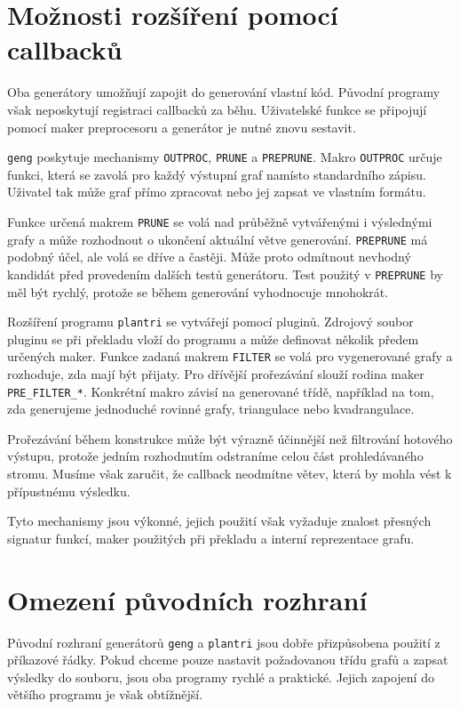\section{Možnosti rozšíření pomocí callbacků}
\label{sec:generator-callbacks}


Oba generátory umožňují zapojit do generování vlastní kód. Původní programy
však neposkytují registraci callbacků za běhu. Uživatelské funkce se připojují
pomocí maker preprocesoru a generátor je nutné znovu sestavit.

\texttt{geng} poskytuje mechanismy \texttt{OUTPROC}, \texttt{PRUNE} a
\texttt{PREPRUNE}. Makro \texttt{OUTPROC} určuje funkci, která se zavolá pro
každý výstupní graf namísto standardního zápisu. Uživatel tak může graf přímo
zpracovat nebo jej zapsat ve vlastním formátu.

Funkce určená makrem \texttt{PRUNE} se volá nad průběžně vytvářenými i
výslednými grafy a může rozhodnout o ukončení aktuální větve generování.
\texttt{PREPRUNE} má podobný účel, ale volá se dříve a častěji. Může proto
odmítnout nevhodný kandidát před provedením dalších testů generátoru. Test
použitý v \texttt{PREPRUNE} by měl být rychlý, protože se během generování
vyhodnocuje mnohokrát.

Rozšíření programu \texttt{plantri} se vytvářejí pomocí pluginů. Zdrojový
soubor pluginu se při překladu vloží do programu a může definovat několik
předem určených maker. Funkce zadaná makrem \texttt{FILTER} se volá pro
vygenerované grafy a rozhoduje, zda mají být přijaty. Pro dřívější
prořezávání slouží rodina maker \texttt{PRE\_FILTER\_*}. Konkrétní makro
závisí na generované třídě, například na tom, zda generujeme jednoduché
rovinné grafy, triangulace nebo kvadrangulace.

Prořezávání během konstrukce může být výrazně účinnější než filtrování
hotového výstupu, protože jedním rozhodnutím odstraníme celou část
prohledávaného stromu. Musíme však zaručit, že callback neodmítne větev, která
by mohla vést k přípustnému výsledku.

Tyto mechanismy jsou výkonné, jejich použití však vyžaduje znalost přesných
signatur funkcí, maker použitých při překladu a interní reprezentace grafu.

\section{Omezení původních rozhraní}
\label{sec:original-interface-limitations}

Původní rozhraní generátorů \texttt{geng} a \texttt{plantri} jsou dobře
přizpůsobena použití z příkazové řádky. Pokud chceme pouze nastavit požadovanou
třídu grafů a zapsat výsledky do souboru, jsou oba programy rychlé a praktické.
Jejich zapojení do většího programu je však obtížnější.

